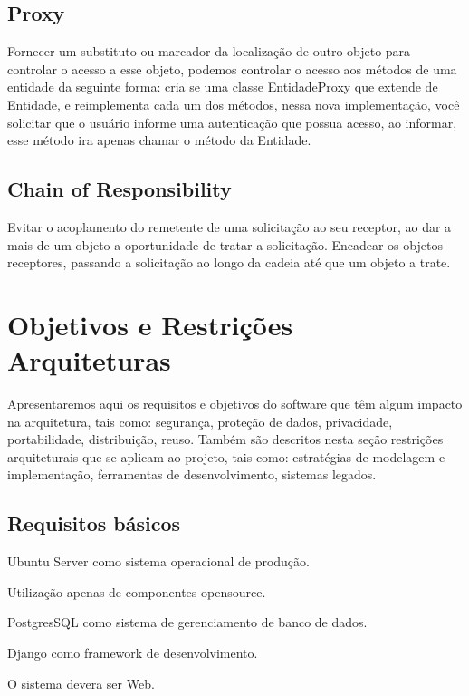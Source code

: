 \subsection{Proxy}
Fornecer um substituto ou marcador da localização de outro objeto para controlar 
o acesso a esse objeto, podemos controlar o acesso aos métodos de uma entidade 
da seguinte forma: cria se uma classe EntidadeProxy que extende de Entidade, e 
reimplementa cada um dos métodos, nessa nova implementação, você solicitar que o 
usuário informe uma autenticação que possua acesso, ao informar, esse método ira 
apenas chamar o método da Entidade.   

\subsection{Chain of Responsibility}
Evitar o acoplamento do remetente de uma solicitação ao seu receptor, ao dar a 
mais de um objeto a oportunidade de tratar a solicitação. Encadear os objetos 
receptores, passando a solicitação ao longo da cadeia até que um objeto a trate.

\section{Objetivos e Restrições Arquiteturas}

Apresentaremos aqui os requisitos e objetivos do software que têm algum impacto 
na arquitetura, tais como: segurança, proteção de dados, privacidade, 
portabilidade, distribuição, reuso. Também são descritos nesta seção restrições 
arquiteturais que se aplicam ao projeto, tais  como:  estratégias  de  modelagem 
 e  implementação,  ferramentas  de  desenvolvimento, sistemas legados. 

\subsection{Requisitos básicos}
\begin{alineascomponto}
	\item Ubuntu Server como sistema operacional de produção.
	\item Utilização apenas de componentes opensource.
	\item PostgresSQL como sistema de gerenciamento de banco de dados.
	\item Django como framework de desenvolvimento.	
	\item O sistema devera ser Web.
\end{alineascomponto}


